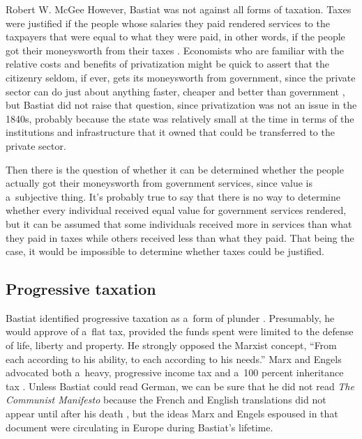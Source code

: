 \begin{artengenv}{Robert W. McGee}
However, Bastiat was not against all forms of taxation. Taxes were justified if the people whose salaries they paid rendered services to the taxpayers that were equal to what they were paid, in other words, if the people got their moneysworth from their taxes 
\parencite[][p.182]{bastiat_selected_1964}. %
 Economists who are familiar with the relative costs and benefits of privatization might be quick to assert that the citizenry seldom, if ever, gets its moneysworth from government, since the private sector can do just about anything faster, cheaper and better than government 
\parencites[][]{finley_public_1989}[][]{ohashi_privatization_nodate}[][]{pirie_privatization_1988}[][]{savas_privatizing_1991}, %
 but Bastiat did not raise that question, since privatization was not an issue in the 1840s, probably because the state was relatively small at the time in terms of the institutions and infrastructure that it owned that could be transferred to the private sector.



Then there is the question of whether it can be determined whether the people actually got their moneysworth from government services, since value is a~subjective thing. It's probably true to say that there is no way to determine whether every individual received equal value for government services rendered, but it can be assumed that some individuals received more in services than what they paid in taxes while others received less than what they paid. That being the case, it would be impossible to determine whether taxes could be justified.



\subsection{Progressive taxation}



Bastiat identified progressive taxation as a~form of plunder 
\parencite[][pp.18]{bastiat_foreward_1998}. %
 Presumably, he would approve of a~flat tax, provided the funds spent were limited to the defense of life, liberty and property. He strongly opposed the Marxist concept, ``From each according to his ability, to each according to his needs.'' 
\parencite[][]{marx_kritik_1875} %
 Marx and Engels advocated both a~heavy, progressive income tax and a~100 percent inheritance tax 
\parencite[][]{marx_manifest_1848}. %
 Unless Bastiat could read German, we can be sure that he did not read \textit{The Communist Manifesto} 
\parencite[][]{marx_manifest_1848} %
 because the French and English translations did not appear until after his death 
\parencite[see][]{marx_communist_2010}, %
 but the ideas Marx and Engels espoused in that document were circulating in Europe during Bastiat's lifetime.




\end{artengenv}
